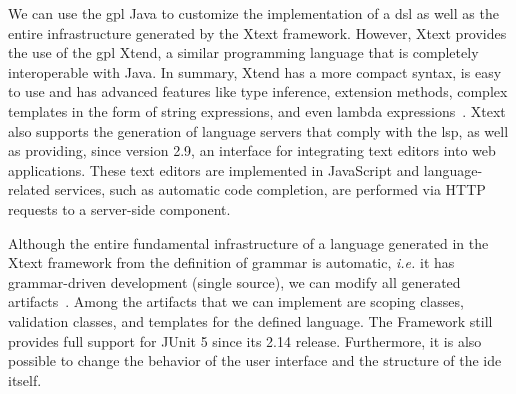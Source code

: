 We can use the \ac{gpl} Java to customize the implementation of a \ac{dsl} as well as the entire infrastructure generated by the Xtext framework.
However, Xtext provides the use of the \ac{gpl} Xtend, a similar programming language that is completely interoperable with Java. 
In summary, Xtend has a more compact syntax, is easy to use and has advanced features like type inference, extension methods, complex templates in the form of string expressions, and even lambda expressions~\cite{Bettini:2016}.
Xtext also supports the generation of language servers that comply with the \ac{lsp}, as well as providing, since version 2.9, an interface for integrating text editors into web applications.
These text editors are implemented in JavaScript and language-related services, such as automatic code completion, are performed via HTTP requests to a server-side component.

Although the entire fundamental infrastructure of a language generated in the Xtext framework from the definition of grammar is automatic, \textit{i.e.} it has grammar-driven development (single source), we can modify all generated artifacts~\cite{XtextSirius:2017}.
Among the artifacts that we can implement are scoping classes, validation classes, and templates for the defined language.
The Framework still provides full support for JUnit 5 since its 2.14 release.
Furthermore, it is also possible to change the behavior of the user interface and the structure of the \ac{ide} itself.


